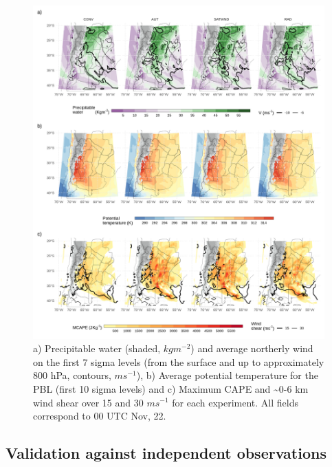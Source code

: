 \documentclass[final,5p,times,twocolumn,authoryear]{elsarticle} %
\begin{document}
\begin{figure}
\includegraphics[width=1\linewidth]{../figures/summary-fields-1} \caption{a) Precipitable water (shaded, \(kgm^{-2}\)) and average northerly wind on the first 7 sigma levels (from the surface and up to approximately 800 hPa, contours, \(ms^{-1}\)), b) Average potential temperature for the PBL (first 10 sigma levels) and c) Maximum CAPE and \textasciitilde0-6 km wind shear over 15 and 30 \(ms^{-1}\) for each experiment. All fields correspond to 00 UTC Nov, 22.}\label{fig:summary-fields}
\end{figure}

\hypertarget{validation-against-independent-observations}{%
\subsection{Validation against independent observations}\label{validation-against-independent-observations}}
\end{document}
